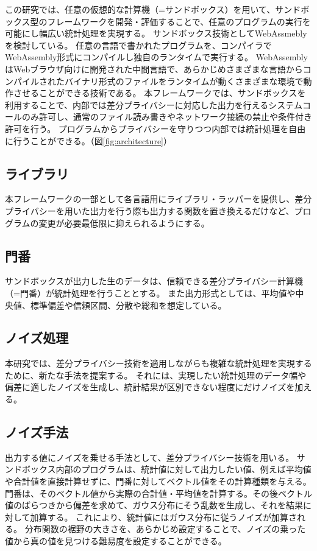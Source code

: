 \documentclass[a4paper,11pt]{jreport}
\begin{document}
この研究では、任意の仮想的な計算機（=サンドボックス）を用いて、サンドボックス型のフレームワークを開発・評価することで、任意のプログラムの実行を可能にし幅広い統計処理を実現する。
サンドボックス技術としてWebAssmeblyを検討している。
任意の言語で書かれたプログラムを、コンパイラでWebAssembly形式にコンパイルし独自のランタイムで実行する。
WebAssemblyはWebブラウザ向けに開発された中間言語で、あらかじめさまざまな言語からコンパイルされたバイナリ形式のファイルをランタイムが動くさまざまな環境で動作させることができる技術である。
本フレームワークでは、サンドボックスを利用することで、内部では差分プライバシーに対応した出力を行えるシステムコールのみ許可し、通常のファイル読み書きやネットワーク接続の禁止や条件付き許可を行う。
プログラムからプライバシーを守りつつ内部では統計処理を自由に行うことができる。（図\ref{fig:architecture}）

\subsection{ライブラリ}

本フレームワークの一部として各言語用にライブラリ・ラッパーを提供し、差分プライバシーを用いた出力を行う際も出力する関数を置き換えるだけなど、プログラムの変更が必要最低限に抑えられるようにする。

\subsection{門番}

サンドボックスが出力した生のデータは、信頼できる差分プライバシー計算機（=門番）が統計処理を行うこととする。
また出力形式としては、平均値や中央値、標準偏差や信頼区間、分散や総和を想定している。

\subsection{ノイズ処理}
本研究では、差分プライバシー技術を適用しながらも複雑な統計処理を実現するために、新たな手法を提案する。
それには、実現したい統計処理のデータ幅や偏差に適したノイズを生成し、統計結果が区別できない程度にだけノイズを加える。

\subsection{ノイズ手法}

出力する値にノイズを乗せる手法として、差分プライバシー技術を用いる。
サンドボックス内部のプログラムは、統計値に対して出力したい値、例えば平均値や合計値を直接計算せずに、門番に対してベクトル値をその計算種類を与える。
門番は、そのベクトル値から実際の合計値・平均値を計算する。その後ベクトル値のばらつきから偏差を求めて、ガウス分布にそう乱数を生成し、それを結果に対して加算する。
これにより、統計値にはガウス分布に従うノイズが加算される。
分布関数の裾野の大きさを、あらかじめ設定することで、ノイズの乗った値から真の値を見つける難易度を設定することができる。
\end{document}
